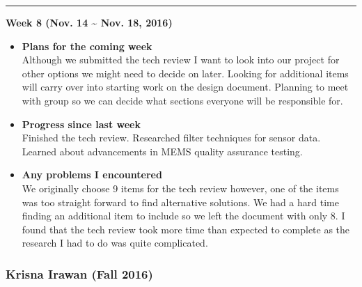 		\rule{\textwidth}{0.5pt}

		\begin{center}
			\textbf{Week 8 (Nov. 14 {\textasciitilde{}} Nov. 18, 2016)}
		\end{center}
		\begin{itemize}
			\item \textbf{Plans for the coming week}
			\\ Although we submitted the tech review I want to look into our project for other options we might need to decide on later. Looking for additional items will carry over into starting work on the design document. Planning to meet with group so we can decide what sections everyone will be responsible for.\\

			\item \textbf{Progress since last week}
			\\Finished the tech review. Researched filter techniques for sensor data. Learned about advancements in MEMS quality assurance testing.\\

			\item \textbf{Any problems I encountered}
			\\We originally choose 9 items for the tech review however, one of the items was too straight forward to find alternative solutions. We had a hard time finding an additional item to include so we left the document with only 8. I found that the tech review took more time than expected to complete as the research I had to do was quite complicated.\\
		\end{itemize}


		\subsubsection{Krisna Irawan (Fall 2016)}
		\vspace{0.5cm}

